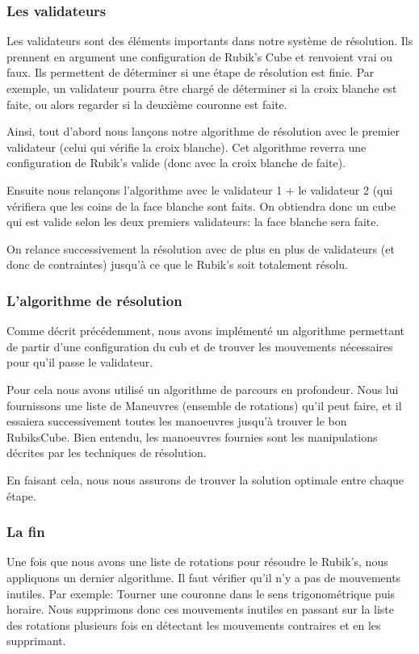 \subsubsection{Les validateurs}
Les validateurs sont des éléments importants dans notre système de résolution.
Ils prennent en argument une configuration de Rubik's Cube et renvoient vrai ou faux.
Ils permettent de déterminer si une étape de résolution est finie.
Par exemple, un validateur pourra être chargé de déterminer si la croix blanche est faite, ou alors regarder si la deuxième couronne est faite.

Ainsi, tout d'abord nous lançons notre algorithme de résolution avec le premier validateur (celui qui vérifie la croix blanche).
Cet algorithme reverra une configuration de Rubik's valide (donc avec la croix blanche de faite).

Ensuite nous relançons l'algorithme avec le validateur 1 + le validateur 2 (qui vérifiera que les coins de la face blanche sont faits.
On obtiendra donc un cube qui est valide selon les deux premiers validateurs: la face blanche sera faite.

On relance successivement la résolution avec de plus en plus de validateurs (et donc de contraintes) jusqu'à ce que le Rubik's soit totalement résolu.

\subsubsection{L'algorithme de résolution}
Comme décrit précédemment, nous avons implémenté un algorithme permettant de partir d'une configuration du cub et de trouver les mouvements nécessaires pour qu'il passe le validateur.

Pour cela nous avons utilisé un algorithme de parcours en profondeur.
Nous lui fournissons une liste de Maneuvres (ensemble de rotations) qu'il peut faire, et il essaiera successivement toutes les manoeuvres jusqu'à trouver le bon RubiksCube.
Bien entendu, les manoeuvres fournies sont les manipulations décrites par les techniques de résolution.

En faisant cela, nous nous assurons de trouver la solution optimale entre chaque étape.

\subsubsection{La fin}
Une fois que nous avons une liste de rotations pour résoudre le Rubik's, nous appliquons un dernier algorithme.
Il faut vérifier qu'il n'y a pas de mouvements inutiles.
Par exemple: Tourner une couronne dans le sens trigonométrique puis horaire.
Nous supprimons donc ces mouvements inutiles en passant sur la liste des rotations plusieurs fois en détectant les mouvements contraires et en les supprimant.




